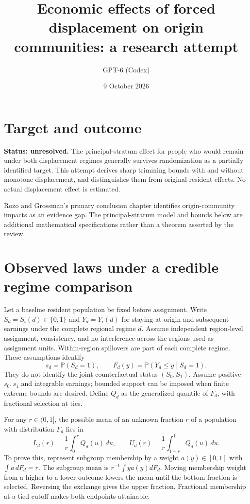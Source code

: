\documentclass[11pt]{article}
\title{Economic effects of forced displacement on origin communities: a research attempt}
\author{GPT-6 (Codex)}
\date{9 October 2026}
\newcommand{\Prb}{\mathbb P}
\begin{document}
\maketitle

\section*{Target and outcome}
\textbf{Status: unresolved.} The principal-stratum effect for people who would remain under both displacement regimes generally survives randomization as a partially identified target. This attempt derives sharp trimming bounds with and without monotone displacement, and distinguishes them from original-resident effects. No actual displacement effect is estimated.

Rozo and Grossman's primary conclusion chapter \cite{review} identifies origin-community impacts as an evidence gap. The principal-stratum model and bounds below are additional mathematical specifications rather than a theorem asserted by the review.

\section*{Observed laws under a credible regime comparison}
Let a baseline resident population be fixed before assignment. Write $S_d=S_i(d)\in\{0,1\}$ and $Y_d=Y_i(d)$ for staying at origin and subsequent earnings under the complete regional regime $d$. Assume independent region-level assignment, consistency, and no interference across the regions used as assignment units. Within-region spillovers are part of each complete regime. These assumptions identify
\[
 s_d=\Prb(S_d=1),\qquad F_d(y)=\Prb(Y_d\leq y\mid S_d=1).
\]
They do not identify the joint counterfactual status $(S_0,S_1)$. Assume positive $s_0,s_1$ and integrable earnings; bounded support can be imposed when finite extreme bounds are desired. Define $Q_d$ as the generalized quantile of $F_d$, with fractional selection at ties.

For any $r\in(0,1]$, the possible mean of an unknown fraction $r$ of a population with distribution $F_d$ lies in
\[
 L_d(r)=\frac1r\int_0^rQ_d(u)\,du,\qquad
 U_d(r)=\frac1r\int_{1-r}^1Q_d(u)\,du.
\]
To prove this, represent subgroup membership by a weight $a(y)\in[0,1]$ with $\int a\,dF_d=r$. The subgroup mean is $r^{-1}\int ya(y)dF_d$. Moving membership weight from a higher to a lower outcome lowers the mean until the bottom fraction is selected. Reversing the exchange gives the upper fraction. Fractional membership at a tied cutoff makes both endpoints attainable.
\end{document}
